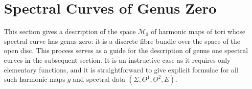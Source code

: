 \documentclass{article}
\numberwithin{equation}{section}
\numberwithin{figure}{section}
\begin{document}
\section{Spectral Curves of Genus Zero}\label{sec:Genus Zero}

This section gives a description of the space $\mathcal{M}_0$ of harmonic maps of tori whose spectral curve has genus zero: it is a discrete fibre bundle over the space of the open disc. This process serves as a guide for the description of genus one spectral curves in the subsequent section. It is an instructive case as it requires only elementary functions, and it is straightforward to give explicit formulae for all such harmonic maps $g$ and spectral data $(\Sigma,\Theta^1,\Theta^2,E)$. 

\end{document}
